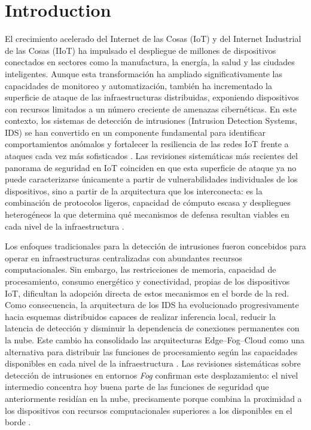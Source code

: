 \documentclass[journal,article,submit,moreauthors]{Definitions/mdpi}
\begin{document}

\section{Introduction}

El crecimiento acelerado del Internet de las Cosas (IoT) y del Internet Industrial de las Cosas (IIoT) ha impulsado el despliegue de millones de dispositivos conectados en sectores como la manufactura, la energía, la salud y las ciudades inteligentes. Aunque esta transformación ha ampliado significativamente las capacidades de monitoreo y automatización, también ha incrementado la superficie de ataque de las infraestructuras distribuidas, exponiendo dispositivos con recursos limitados a un número creciente de amenazas cibernéticas. En este contexto, los sistemas de detección de intrusiones (Intrusion Detection Systems, IDS) se han convertido en un componente fundamental para identificar comportamientos anómalos y fortalecer la resiliencia de las redes IoT frente a ataques cada vez más sofisticados \cite{Ni2024,Amanullah2020,Bagaa2020}. Las revisiones sistemáticas más recientes del panorama de seguridad en IoT coinciden en que esta superficie de ataque ya no puede caracterizarse únicamente a partir de vulnerabilidades individuales de los dispositivos, sino a partir de la arquitectura que los interconecta: es la combinación de protocolos ligeros, capacidad de cómputo escasa y despliegues heterogéneos la que determina qué mecanismos de defensa resultan viables en cada nivel de la infraestructura \cite{Lim2025}.

Los enfoques tradicionales para la detección de intrusiones fueron concebidos para operar en infraestructuras centralizadas con abundantes recursos computacionales. Sin embargo, las restricciones de memoria, capacidad de procesamiento, consumo energético y conectividad, propias de los dispositivos IoT, dificultan la adopción directa de estos mecanismos en el borde de la red. Como consecuencia, la arquitectura de los IDS ha evolucionado progresivamente hacia esquemas distribuidos capaces de realizar inferencia local, reducir la latencia de detección y disminuir la dependencia de conexiones permanentes con la nube. Este cambio ha consolidado las arquitecturas Edge--Fog--Cloud como una alternativa para distribuir las funciones de procesamiento según las capacidades disponibles en cada nivel de la infraestructura \cite{SaravanaBalaji2023,Ni2024,Dini2024}. Las revisiones sistemáticas sobre detección de intrusiones en entornos \textit{Fog} confirman este desplazamiento: el nivel intermedio concentra hoy buena parte de las funciones de seguridad que anteriormente residían en la nube, precisamente porque combina la proximidad a los dispositivos con recursos computacionales superiores a los disponibles en el borde \cite{Tamuka2026}.
\end{document}
